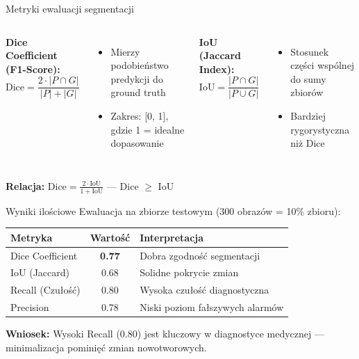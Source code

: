 \documentclass{beamer}
\begin{document}
\begin{frame}{Metryki ewaluacji segmentacji}
    \begin{columns}
        \textbf{Dice Coefficient (F1-Score):}
        \begin{equation*}
            \text{Dice} = \frac{2 \cdot |P \cap G|}{|P| + |G|}
        \end{equation*}
        \begin{itemize}
            \item Mierzy podobieństwo predykcji do ground truth
            \item Zakres: [0, 1], gdzie 1 = idealne dopasowanie
        \end{itemize}

        \textbf{IoU (Jaccard Index):}
        \begin{equation*}
            \text{IoU} = \frac{|P \cap G|}{|P \cup G|}
        \end{equation*}
        \begin{itemize}
            \item Stosunek części wspólnej do sumy zbiorów
            \item Bardziej rygorystyczna niż Dice
        \end{itemize}
    \end{columns}
    \vspace{0.3cm}
    \textbf{Relacja:} $\text{Dice} = \frac{2 \cdot \text{IoU}}{1 + \text{IoU}}$ — Dice $\geq$ IoU
\end{frame}

\begin{frame}{Wyniki ilościowe}
    Ewaluacja na zbiorze testowym (300 obrazów = 10\% zbioru):
    \begin{table}
        \centering
        \begin{tabular}{|l|c|l|}
            \hline
            \textbf{Metryka} & \textbf{Wartość} & \textbf{Interpretacja} \\
            \hline
            Dice Coefficient & \textbf{0.77} & Dobra zgodność segmentacji \\
            \hline
            IoU (Jaccard) & 0.68 & Solidne pokrycie zmian \\
            \hline
            Recall (Czułość) & 0.80 & Wysoka czułość diagnostyczna \\
            \hline
            Precision & 0.78 & Niski poziom fałszywych alarmów \\
            \hline
        \end{tabular}
    \end{table}
    \vspace{0.2cm}
    \textbf{Wniosek:} Wysoki Recall (0.80) jest kluczowy w diagnostyce medycznej — minimalizacja pominięć zmian nowotworowych.
\end{frame}
\end{document}
